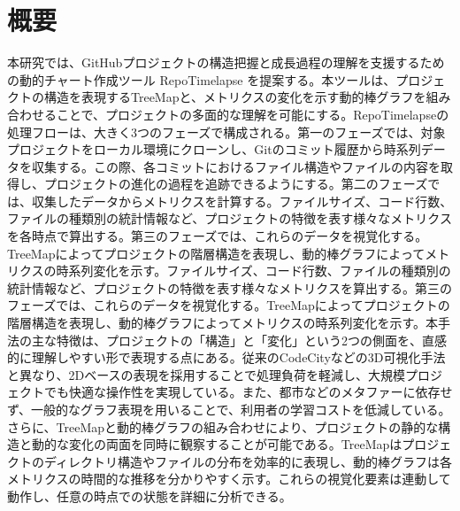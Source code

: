 \documentclass[12pt,twoside]{jbook}
\begin{document}
\section{概要}
本研究では、GitHubプロジェクトの構造把握と成長過程の理解を支援するための動的チャート作成ツール RepoTimelapse を提案する。本ツールは、プロジェクトの構造を表現するTreeMapと、メトリクスの変化を示す動的棒グラフを組み合わせることで、プロジェクトの多面的な理解を可能にする。RepoTimelapseの処理フローは、大きく3つのフェーズで構成される。第一のフェーズでは、対象プロジェクトをローカル環境にクローンし、Gitのコミット履歴から時系列データを収集する。この際、各コミットにおけるファイル構造やファイルの内容を取得し、プロジェクトの進化の過程を追跡できるようにする。第二のフェーズでは、収集したデータからメトリクスを計算する。ファイルサイズ、コード行数、ファイルの種類別の統計情報など、プロジェクトの特徴を表す様々なメトリクスを各時点で算出する。第三のフェーズでは、これらのデータを視覚化する。TreeMapによってプロジェクトの階層構造を表現し、動的棒グラフによってメトリクスの時系列変化を示す。ファイルサイズ、コード行数、ファイルの種類別の統計情報など、プロジェクトの特徴を表す様々なメトリクスを算出する。第三のフェーズでは、これらのデータを視覚化する。TreeMapによってプロジェクトの階層構造を表現し、動的棒グラフによってメトリクスの時系列変化を示す。本手法の主な特徴は、プロジェクトの「構造」と「変化」という2つの側面を、直感的に理解しやすい形で表現する点にある。従来のCodeCityなどの3D可視化手法と異なり、2Dベースの表現を採用することで処理負荷を軽減し、大規模プロジェクトでも快適な操作性を実現している。また、都市などのメタファーに依存せず、一般的なグラフ表現を用いることで、利用者の学習コストを低減している。さらに、TreeMapと動的棒グラフの組み合わせにより、プロジェクトの静的な構造と動的な変化の両面を同時に観察することが可能である。TreeMapはプロジェクトのディレクトリ構造やファイルの分布を効率的に表現し、動的棒グラフは各メトリクスの時間的な推移を分かりやすく示す。これらの視覚化要素は連動して動作し、任意の時点での状態を詳細に分析できる。
\end{document}
